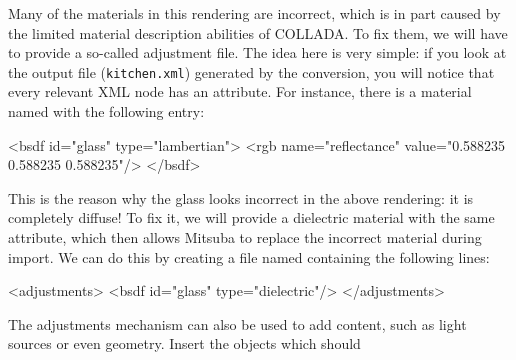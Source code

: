 \begin{center}
\end{center}
Many of the materials in this rendering are incorrect, which is in part caused by the limited material description abilities of COLLADA.
To fix them, we will have to provide a so-called adjustment file. The idea here is very simple: if you look at the output file (\texttt{kitchen.xml}) 
generated by the conversion, you will notice that every relevant XML node has an  attribute. For instance, there is a material named  with the following entry:
\begin{xml}
<bsdf id="glass" type="lambertian">
	<rgb name="reflectance" value="0.588235 0.588235 0.588235"/>
</bsdf>
\end{xml}
\newpage
This is the reason why the glass looks incorrect in the above rendering: it is completely diffuse!
To fix it, we will provide a dielectric material with the same  attribute, which then allows Mitsuba
to replace the incorrect material during import.
We can do this by creating a file named  containing
the following lines:
\begin{xml}
<adjustments>
	<bsdf id="glass" type="dielectric"/>
</adjustments>
\end{xml}
The adjustments mechanism can also be used to add content, such as light sources or even geometry. Insert the objects which should
